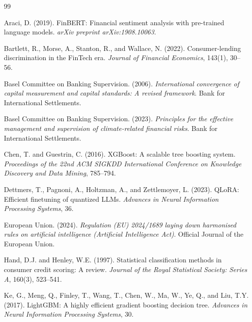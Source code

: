\documentclass[11pt,a4paper]{article}
\begin{document}

\begin{thebibliography}{99}

Araci, D. (2019).
FinBERT: Financial sentiment analysis with pre-trained language models.
\emph{arXiv preprint arXiv:1908.10063}.

Bartlett, R., Morse, A., Stanton, R., and Wallace, N. (2022).
Consumer-lending discrimination in the FinTech era.
\emph{Journal of Financial Economics}, 143(1), 30--56.

Basel Committee on Banking Supervision. (2006).
\emph{International convergence of capital measurement and capital standards: A revised framework}.
Bank for International Settlements.

Basel Committee on Banking Supervision. (2023).
\emph{Principles for the effective management and supervision of climate-related financial risks}.
Bank for International Settlements.

Chen, T. and Guestrin, C. (2016).
XGBoost: A scalable tree boosting system.
\emph{Proceedings of the 22nd ACM SIGKDD International Conference on Knowledge Discovery and Data Mining}, 785--794.

Dettmers, T., Pagnoni, A., Holtzman, A., and Zettlemoyer, L. (2023).
QLoRA: Efficient finetuning of quantized LLMs.
\emph{Advances in Neural Information Processing Systems}, 36.

European Union. (2024).
\emph{Regulation (EU) 2024/1689 laying down harmonised rules on artificial intelligence (Artificial Intelligence Act)}.
Official Journal of the European Union.

Hand, D.J. and Henley, W.E. (1997).
Statistical classification methods in consumer credit scoring: A review.
\emph{Journal of the Royal Statistical Society: Series A}, 160(3), 523--541.

Ke, G., Meng, Q., Finley, T., Wang, T., Chen, W., Ma, W., Ye, Q., and Liu, T.Y. (2017).
LightGBM: A highly efficient gradient boosting decision tree.
\emph{Advances in Neural Information Processing Systems}, 30.


\end{thebibliography}
\end{document}
